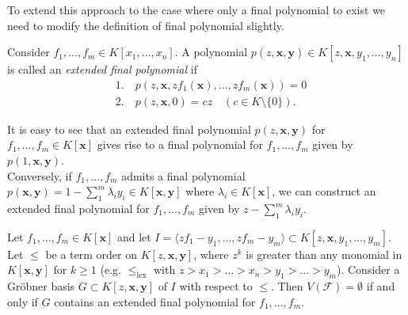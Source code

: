 To extend this approach to the case where only a final polynomial to exist we need to modify the definition of final polynomial slightly.
\begin{definition}
    Consider $f_1,\dots,f_m\in K[x_1,\dots,x_n]$. A polynomial $p(z,\mathbf{x},\mathbf{y})\in K[z,\mathbf{x},y_1,\dots,y_n]$ is called an \textit{extended final polynomial} if 
    \begin{align*}
        &1.\quad p(z,\mathbf{x},zf_1(\mathbf{x}),\dots, zf_m(\mathbf{x})) = 0\\
        &2. \quad p(z,\mathbf{x}, 0) = cz \quad (c\in K\setminus\{0\}).
    \end{align*}
\end{definition}
\begin{remark}\label{FinalPolIffExtendedFinalPol}
    It is easy to see that an extended final polynomial $p(z,\mathbf{x},\mathbf{y})$ for $f_1,\dots, f_m\in K[\mathbf{x}]$ gives rise to a final polynomial for $f_1,\dots,f_m$ given by $p(1,\mathbf{x},\mathbf{y})$. \\
    Conversely, if $f_1,\dots,f_m$ admits a final polynomial $p(\mathbf{x},\mathbf{y})= 1 - \sum_1^m \lambda_iy_i\in K[\mathbf{x},\mathbf{y}]$ where $\lambda_i\in K[\mathbf{x}]$, we can construct an extended final polynomial for $f_1,\dots,f_m$ given by $z-\sum_1^m \lambda_iy_i$.
\end{remark}
\begin{theorem}\label{ExtendedFinPolTheorem}
    Let $f_1,\dots,f_m\in K[\mathbf{x}]$ and let $I= \langle zf_1-y_1,\dots,zf_m -y_m\rangle \subset K[z,\mathbf{x},y_1,\dots,y_m]$. Let $\leq$ be a term order on $K[z,\mathbf{x},\mathbf{y}]$, where $z^k$ is greater than any monomial in $K[\mathbf{x}, \mathbf{y}]$ for $k\geq 1$ (e.g. $\leq_\text{lex}$ with $z>x_1>\dots>x_n>y_1>\dots>y_m$). Consider a Gröbner basis $G\subset K[z,\mathbf{x},\mathbf{y}]$ of $I$ with respect to $\leq$. Then $V(\mathcal{F}) = \emptyset$ if and only if $G$ contains an extended final polynomial for $f_1,\dots,f_m$.
\end{theorem}
